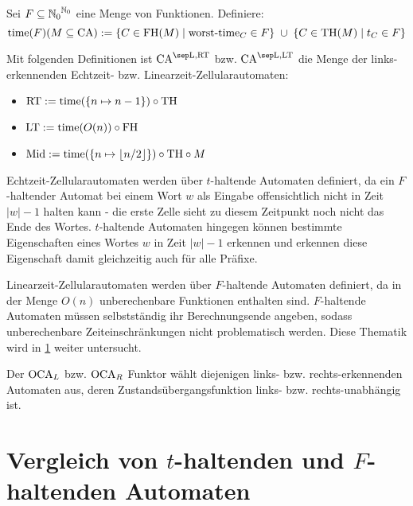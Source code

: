 \begin{definition}
    \label{def:ZeitFunktoren}
    Sei $F \subseteq {\mathbb{N}_0}^{\mathbb{N}_0}$ eine Menge von Funktionen. Definiere:
    \[
        \mathrm{time}(F)(M \subseteq \textrm{CA}) := \{ { C \in \textrm{FH}(M) } \; | \; { \operatorname{worst-time}_C \in F } \} \; \cup \; \{ { C \in \textrm{TH}(M) } \; | \; { t_C \in F } \}
    \]
    
    Mit folgenden Definitionen ist $\CAM{\CALeft, \CART}$ \acs{bzw.} $\CAM{\CALeft, \CALT}$ die Menge der links-erkennenden Echtzeit- \acs{bzw.} Linearzeit-Zellularautomaten:

    \begin{itemize}
        \item $\mathrm{\textrm{RT}} := \mathrm{time}(\{ {n \mapsto n - 1} \}) \circ \textrm{TH}$
        \item $\mathrm{\textrm{LT}} := \mathrm{time}(O(n)) \circ \textrm{FH}$
        \item $\mathrm{Mid} := \mathrm{time}(\{ {n \mapsto \lfloor n/2 \rfloor} \}) \circ \textrm{TH} \circ M $
    \end{itemize}   
\end{definition}

Echtzeit-Zellularautomaten werden über $t$-haltende Automaten definiert, da ein
$F$-haltender Automat bei einem Wort $w$ als Eingabe offensichtlich nicht in Zeit $|w|-1$ halten kann -
die erste Zelle sieht zu diesem Zeitpunkt noch nicht das Ende des Wortes.
$t$-haltende Automaten hingegen können bestimmte Eigenschaften eines Wortes $w$ in Zeit $|w|-1$ erkennen
und erkennen diese Eigenschaft damit gleichzeitig auch für alle Präfixe.

Linearzeit-Zellularautomaten werden über $F$-haltende Automaten definiert,
da in der Menge $O(n)$ unberechenbare Funktionen enthalten sind.
$F$-haltende Automaten müssen selbstständig ihr Berechnungsende angeben, sodass
unberechenbare Zeiteinschränkungen nicht problematisch werden.
Diese Thematik wird in \cref{sec:Vergleich_t_haltend_F_haltend} weiter untersucht.

\begin{definition}
    Der $\operatorname{OCA}_L$ \acs{bzw.} $\operatorname{OCA}_R$ Funktor wählt diejenigen links- \acs{bzw.} rechts-erkennenden Automaten aus, deren Zustandsübergangsfunktion links- \acs{bzw.} rechts-unabhängig ist.
\end{definition}

\section{Vergleich von \texorpdfstring{$t$}{t}-haltenden und \texorpdfstring{$F$}{F}-haltenden Automaten}
\label{sec:Vergleich_t_haltend_F_haltend}

